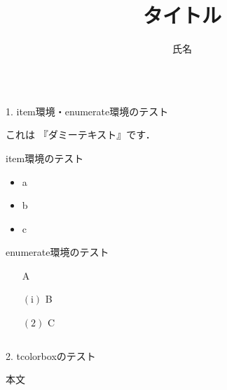 \documentclass[dvipdfmx,10pt,notheor]{beamer}
\title{タイトル}
\author{氏名}
\institute{所属}
\theoremstyle{definition}
\numberwithin{equation}{section}      %
\begin{document}
\begin{frame}{}
\vfill


\begin{columns}[T]
\begin{column}{.98\linewidth}
\begin{mybox}{1. item環境・enumerate環境のテスト}
\begin{minipage}[t]{0.45\textwidth}
    \vspace{0pt}
    これは{\LARGE{\color{red} 『ダミーテキスト』}}です．\\
    \kant[1]
\end{minipage}
\hfill
\begin{minipage}[t]{0.45\textwidth}
    \vspace{0pt}
    item環境のテスト
    \begin{itemize}
        \item a
        \item b
        \item c
    \end{itemize}
    enumerate環境のテスト
    \begin{enumerate}
        \item [] A
        \item [$( \mathrm{i} )$] B
        \item [$(2)$] C
    \end{enumerate}
\end{minipage}
\end{mybox}
\end{column}
\end{columns}


\vfill


\begin{columns}[T]
\begin{column}{.48\linewidth}
\begin{mybox}{2. tcolorboxのテスト}

\begin{tcolorbox}[left=1mm,
                  colframe=blue,
                  colback=blue!5!white,
                  colbacktitle=blue!70!black,
                  coltitle=white, fonttitle=\bfseries,
                  title=ヘッダー]
    本文
\end{tcolorbox}


\end{mybox}
\end{column}
\end{columns}
\end{frame}
\end{document}
